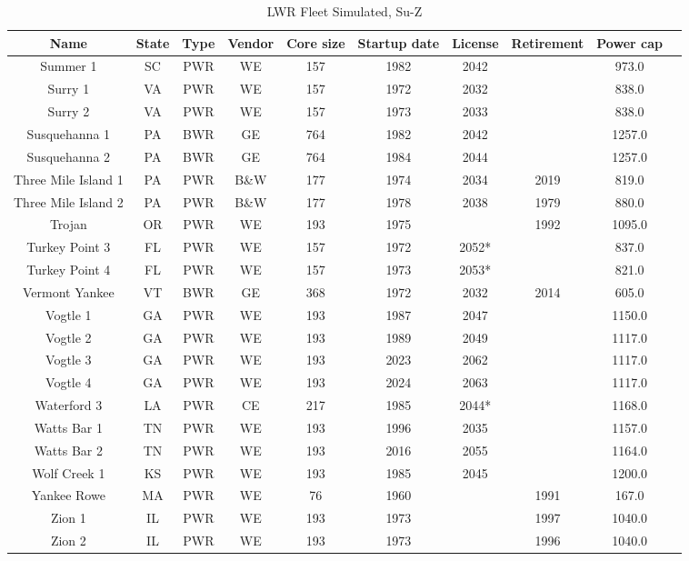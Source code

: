 \begin{table}
    \centering
    \caption{LWR Fleet Simulated, Su-Z}
    \label{tab:lwr_fleet3}
    \begin{tabular}{c c c c c c c c c c}
    \hline
    \textbf{Name} & \textbf{State} & \textbf{Type} & \textbf{Vendor} & \textbf{Core size} & \textbf{Startup date} & \textbf{License} & \textbf{Retirement} & \textbf{Power cap} \\
    \hline
    Summer 1            & SC & PWR & WE   & 157 & 1982 & 2042 &      & 973.0 \\
    Surry 1             & VA & PWR & WE   & 157 & 1972 & 2032 &      & 838.0 \\
    Surry 2             & VA & PWR & WE   & 157 & 1973 & 2033 &      & 838.0 \\
    Susquehanna 1       & PA & BWR & GE   & 764 & 1982 & 2042 &      & 1257.0 \\
    Susquehanna 2       & PA & BWR & GE   & 764 & 1984 & 2044 &      & 1257.0 \\
    Three Mile Island 1 & PA & PWR & B\&W & 177 & 1974 & 2034 & 2019 & 819.0 \\
    Three Mile Island 2 & PA & PWR & B\&W & 177 & 1978 & 2038 & 1979 & 880.0 \\
    Trojan              & OR & PWR & WE   & 193 & 1975 &      & 1992 & 1095.0 \\
    Turkey Point 3      & FL & PWR & WE   & 157 & 1972 & 2052*&      & 837.0 \\
    Turkey Point 4      & FL & PWR & WE   & 157 & 1973 & 2053*&      & 821.0 \\
    Vermont Yankee      & VT & BWR & GE   & 368 & 1972 & 2032 & 2014 & 605.0 \\
    Vogtle 1            & GA & PWR & WE   & 193 & 1987 & 2047 &      & 1150.0 \\
    Vogtle 2            & GA & PWR & WE   & 193 & 1989 & 2049 &      & 1117.0 \\
    Vogtle 3            & GA & PWR & WE   & 193 & 2023 & 2062 &      & 1117.0 \\
    Vogtle 4            & GA & PWR & WE   & 193 & 2024 & 2063 &      & 1117.0 \\
    Waterford 3         & LA & PWR & CE   & 217 & 1985 & 2044*&      & 1168.0 \\
    Watts Bar 1         & TN & PWR & WE   & 193 & 1996 & 2035 &      & 1157.0 \\
    Watts Bar 2         & TN & PWR & WE   & 193 & 2016 & 2055 &      & 1164.0 \\
    Wolf Creek 1        & KS & PWR & WE   & 193 & 1985 & 2045 &      & 1200.0 \\
    Yankee Rowe         & MA & PWR & WE   & 76  & 1960 &      & 1991 & 167.0 \\
    Zion 1              & IL & PWR & WE   & 193 & 1973 &      & 1997 & 1040.0 \\
    Zion 2              & IL & PWR & WE   & 193 & 1973 &      & 1996 & 1040.0 \\
    \hline
    \end{tabular}
\end{table}

